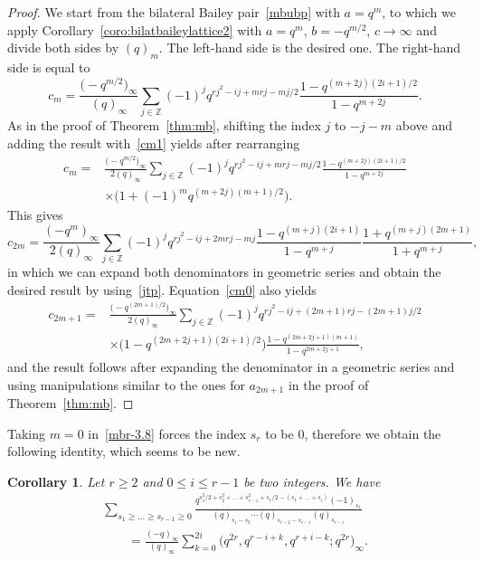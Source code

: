\documentclass[pdftex]{sigma}
\numberwithin{equation}{section}
\newtheorem{Corollary}[Theorem]{Corollary}
\begin{document}
\begin{proof}
We start from the bilateral Bailey pair~\eqref{mbubp} with $a=q^m$, to which we apply Corollary~\ref{coro:bilatbaileylattice2} with $a=q^m$, $b=-q^{m/2}$, $c\to\infty$ and divide both sides by $(q)_m$. The left-hand side is the desired one. The right-hand side is equal to
\begin{equation}\label{cm1}
c_m=\frac{\bigl(-q^{m/2}\bigr)_\infty}{(q)_\infty}\sum_{j\in\mathbb{Z}}(-1)^jq^{rj^2-ij+mrj-mj/2}\frac{1-q^{(m+2j)(2i+1)/2}}{1-q^{m+2j}}.
\end{equation}
As in the proof of Theorem~\ref{thm:mb}, shifting the index $j$ to $-j-m$ above and adding the result with~\eqref{cm1} yields after rearranging
\begin{align}
c_{m}={}&\frac{\bigl(-q^{m/2}\bigr)_\infty}{2(q)_\infty}\sum_{j\in\mathbb{Z}}(-1)^jq^{rj^2-ij+mrj-mj/2}\frac{1-q^{(m+2j)(2i+1)/2}}{1-q^{m+2j}}\nonumber\\
&\times\bigl(1+(-1)^mq^{(m+2j)(m+1)/2}\bigr).\label{cm0}
\end{align}
This gives
\begin{equation*}
c_{2m}=\frac{(-q^{m})_\infty}{2(q)_\infty}\sum_{j\in\mathbb{Z}}(-1)^jq^{rj^2-ij+2mrj-mj}\frac{1-q^{(m+j)(2i+1)}}{1-q^{m+j}}\frac{1+q^{(m+j)(2m+1)}}{1+q^{m+j}},
\end{equation*}
in which we can expand both denominators in geometric series and obtain the desired result by using~\eqref{jtp}. Equation~\eqref{cm0} also yields
\begin{align*}
c_{2m+1}={}&\frac{\bigl(-q^{(2m+1)/2}\bigr)_\infty}{2(q)_\infty}\sum_{j\in\mathbb{Z}}(-1)^jq^{rj^2-ij+(2m+1)rj-(2m+1)j/2}\\
&\times\bigl(1-q^{(2m+2j+1)(2i+1)/2}\bigr)\frac{1-q^{(2m+2j+1)(m+1)}}{1-q^{2m+2j+1}},
\end{align*}
and the result follows after expanding the denominator in a geometric series and using manipulations similar to the ones for $a_{2m+1}$ in the proof of Theorem~\ref{thm:mb}.
\end{proof}

 Taking $m=0$ in~\eqref{mbr-3.8} forces the index $s_r$ to be $0$, therefore we obtain the following identity, which seems to be new.
\begin{Corollary}\label{coro:new1}
Let $r \geq 2$ and $0 \leq i \leq r-1$ be two integers. We have
\begin{gather*}%
\sum_{s_1\geq\dots\geq s_{r-1}\geq0}\frac{q^{s_1^2/2+s_2^2+\dots+s_{r-1}^2+s_1/2-(s_1+\dots+s_{i})}(-1)_{s_1}}{(q)_{s_1-s_2}\cdots(q)_{s_{r-2}-s_{r-1}}(q)_{s_{r-1}}} \\
\qquad=\frac{(-q)_\infty}{(q)_\infty}\sum_{k=0}^{2i}\bigl(q^{2r},q^{r-i+k},q^{r+i-k};q^{2r}\bigr)_\infty.
\end{gather*}
\end{Corollary}
\end{document}
